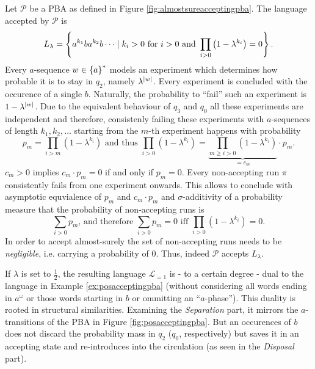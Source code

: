 \begin{example}
  Let $\mathcal{P}$ be a \ac{PBA} as defined in Figure 
  \ref{fig:almostsureacceptingpba}. The language accepted by $\mathcal{P}$ is
  \begin{equation*}
    L_{\lambda} = \left\{a^{k_{1}}ba^{k_{2}}b\dots\mid k_{i}>0\text{ for }i>0
    \text{ and }\prod\limits_{i>0}\left(1-\lambda^{k_{i}}\right) = 0\right\}.
  \end{equation*}
  Every $a$-sequence $w\in\left\{a\right\}^{*}$ models an experiment which determines 
  how probable it is to stay in $q_{2}$, namely $\lambda^{\left\vert{w}\right\vert}$. Every 
  experiment is concluded with the occurence of a single $b$.  Naturally, the 
  probability to \enquote{fail} such an experiment is $1-\lambda^{\left\vert{w}\right\vert}$. 
  Due to the equivalent behaviour of $q_{3}$ and $q_{0}$ all these experiments 
  are independent and therefore, consistenly failing these experiments with 
  $a$-sequences of length $k_{1}, k_{2},\dots$ starting from the $m$-th 
  experiment happens with probability
  \begin{equation*}
    p_{m} = \prod\limits_{i>m}(1-\lambda^{k_{i}})
    \text{ and thus }
    \prod\limits_{i>0}(1-\lambda^{k_{i}}) = 
    \underbrace{\prod\limits_{m\geq i>0}(1-\lambda^{k_{i}})}_{=c_{m}}
    \cdot p_{m}.
  \end{equation*}
  $c_{m} > 0$ implies $c_{m}\cdot p_{m} = 0$ if and only if 
  $p_{m} = 0$.
  Every non-accepting run $\pi$ consistently fails from one experiment onwards.
  This allows to conclude with asymptotic equvialence of $p_{m}$ and 
  $c_{m}\cdot p_{m}$ and $\sigma$-additivity of a probability measure that the 
  probability of non-accepting runs is
  \begin{equation*}
    \sum_{i > 0} p_{m}\text{, and therefore }
    \sum_{i > 0} p_{m} = 0\text{ iff }\prod\limits_{i>0}(1-\lambda^{k_{i}}) =0.
  \end{equation*}
  In order to accept almost-surely the set of non-accepting runs needs to be
  \emph{negligible}, i.e. carrying a probability of $0$.  Thus, indeed 
  $\mathcal{P}$ accepts $L_{\lambda}$.

  If $\lambda$ is set to $\frac{1}{2}$, the resulting language 
  $\mathcal{L}_{=1}$ is - to a certain degree - dual to the language in Example 
  \ref{ex:posacceptingpba} (without considering all words ending in 
  $a^{\omega}$ or those words starting in $b$ or ommitting an 
  \enquote{$a$-phase}). This duality is rooted in structural similarities. 
  Examining the \emph{Separation} part, it mirrors the $a$-transitions of the 
  \ac{PBA} in Figure \ref{fig:posacceptingpba}. But an occurences of $b$ does 
  not discard the probability mass in $q_{2}$ ($q_0$, respectively) but saves
  it in an accepting state and re-introduces into the circulation (as seen in 
  the \emph{Disposal} part).
  \label{ex:almostsureacceptingpba}
\end{example}
